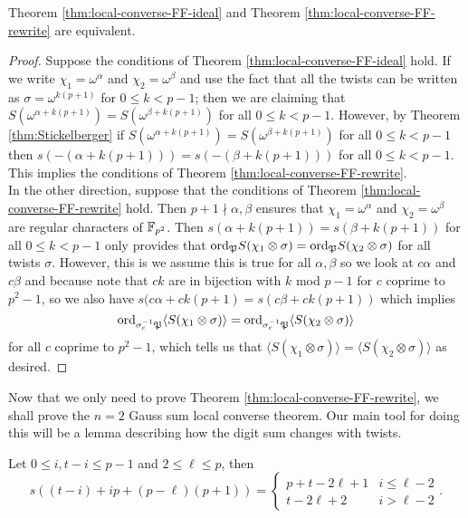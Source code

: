 \begin{prop}
Theorem \ref{thm:local-converse-FF-ideal} and Theorem \ref{thm:local-converse-FF-rewrite} are equivalent.
\end{prop}

\begin{proof}
Suppose the conditions of Theorem \ref{thm:local-converse-FF-ideal} hold. 
If we write $\chi_1 = \omega^\alpha$ and $\chi_2 = \omega^\beta$ and use the fact that all the twists can be written as $\sigma = \omega^{k (p+1)}$ for $0 \leq k < p-1$; then we are claiming that $S(\omega^{\alpha + k(p+1)}) = S(\omega^{\beta+k(p+1)})$ for all $0 \leq k < p-1$. 
However, by Theorem \ref{thm:Stickelberger} if $S(\omega^{\alpha + k(p+1)}) = S(\omega^{\beta+k(p+1)})$ for all $0 \leq k < p-1$ then $s(-(\alpha + k(p+1))) = s(-(\beta+k(p+1)))$ for all $0 \leq k < p-1$. 
This implies the conditions of Theorem \ref{thm:local-converse-FF-rewrite}.
\\

In the other direction, suppose that the conditions of Theorem \ref{thm:local-converse-FF-rewrite} hold. 
Then $p+1 \nmid \alpha, \beta$ ensures that $\chi_1 = \omega^\alpha$ and $\chi_2 = \omega^\beta$ are regular characters of $\mathbb{F}_{p^2}$.
Then $s(\alpha + k(p+1)) = s(\beta + k(p+1))$ for all $0 \leq k < p-1$ only provides that $\textrm{ord}_{\mathfrak{P}} S(\chi_1 \otimes \sigma) = \textrm{ord}_{\mathfrak{P}} S(\chi_2 \otimes \sigma)$ for all twists $\sigma$.
However, this is we assume this is true for all $\alpha, \beta$ so we look at $c \alpha$ and $c \beta$ and because note that $ck$ are in bijection with $k$ mod $p-1$ for $c$ coprime to $p^2-1$, so we also have $s(c\alpha + ck(p+1) = s(c\beta + ck(p+1))$ which implies \[\textrm{ord}_{\sigma_{c}^{-1} \mathfrak{P}} \langle S(\chi_1 \otimes \sigma) \rangle = \textrm{ord}_{\sigma_{c}^{-1} \mathfrak{P}} \langle S(\chi_2 \otimes \sigma) \rangle\] for all $c$ coprime to $p^2 -1$, which tells us that $\langle S(\chi_1\otimes \sigma) \rangle = \langle S(\chi_2 \otimes \sigma) \rangle$ as desired.

\end{proof}

Now that we only need to prove Theorem \ref{thm:local-converse-FF-rewrite}, we shall prove the $n=2$ Gauss sum local converse theorem.
Our main tool for doing this will be a lemma describing how the digit sum changes with twists.

\begin{lemma}
  \label{lem:digit-sum-twist}
  Let $0 \leq i, t-i \leq p-1$ and $2 \leq \ell \leq p$, then 
  \[ s((t-i)+ip+(p-\ell)(p+1)) = \begin{cases} p + t-2\ell+1 & i \leq \ell - 2 \\ t - 2 \ell + 2 & i > \ell -2\end{cases}.\]
\end{lemma}

